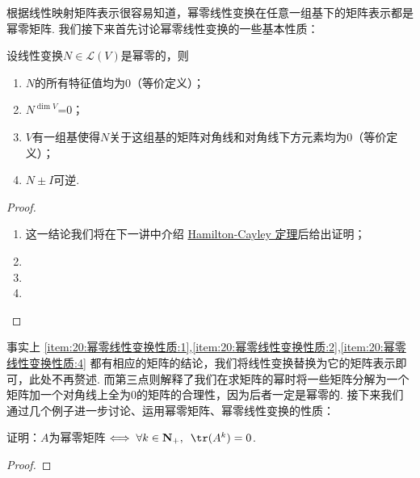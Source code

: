 根据线性映射矩阵表示很容易知道，幂零线性变换在任意一组基下的矩阵表示都是幂零矩阵. 我们接下来首先讨论幂零线性变换的一些基本性质：
\begin{theorem} \label{thm:20:幂零线性变换性质}
    设线性变换$N\in \mathcal{L}(V)$是幂零的，则
    \begin{enumerate}
        \item \label{item:20:幂零线性变换性质:1}
              $N$的所有特征值均为0（等价定义）；

        \item \label{item:20:幂零线性变换性质:2}
              $N^{\dim V}$=0；

        \item \label{item:20:幂零线性变换性质:3}
              $V$有一组基使得$N$关于这组基的矩阵对角线和对角线下方元素均为0（等价定义）；

        \item \label{item:20:幂零线性变换性质:4}
              $N\pm I$可逆.
    \end{enumerate}
\end{theorem}

\begin{proof}
    \begin{enumerate}
        \item 这一结论我们将在下一讲中介绍 \hyperref[thm:21:HC]{Hamilton-Cayley 定理}后给出证明；

        \item

        \item

        \item
    \end{enumerate}
\end{proof}

事实上 \ref*{item:20:幂零线性变换性质:1},\ref*{item:20:幂零线性变换性质:2},\ref*{item:20:幂零线性变换性质:4} 都有相应的矩阵的结论，我们将线性变换替换为它的矩阵表示即可，此处不再赘述. 而第三点则解释了我们在求矩阵的幂时将一些矩阵分解为一个矩阵加一个对角线上全为0的矩阵的合理性，因为后者一定是幂零的. 接下来我们通过几个例子进一步讨论、运用幂零矩阵、幂零线性变换的性质：
\begin{example}
    证明：$A$为幂零矩阵$\iff \forall k \in \mathbf{N}_+,\enspace\tr(A^k)=0$.
\end{example}

\begin{proof}

\end{proof}

